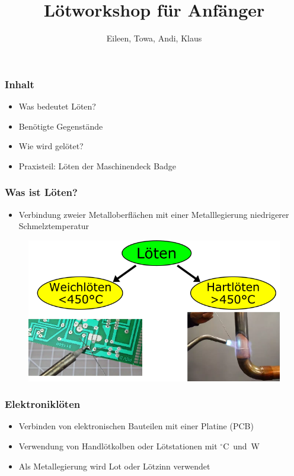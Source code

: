 \documentclass[10pt]{beamer}
\title[soldering-workshop] %
{Lötworkshop für Anfänger}
\author{Eileen, Towa, Andi, Klaus}
\begin{document}
    \maketitle
    
    
    \begin{frame}
    \frametitle{Inhalt}
    \begin{itemize}
    	\item{Was bedeutet Löten?}
    	\item{Benötigte Gegenstände}
    	\item{Wie wird gelötet?}
    	\item{Praxisteil: Löten der Maschinendeck Badge}
    \end{itemize}
	\end{frame}
    
    \begin{frame}
    \frametitle{Was ist Löten?}
    \begin{itemize}
    	\item{Verbindung zweier Metalloberflächen mit einer Metalllegierung niedrigerer Schmelztemperatur}
    \end{itemize}
	\begin{figure}[hbtp]
		\centering
		\includegraphics[width=\linewidth*2/3]{images/weich_hartloeten.png}
	\end{figure}
	\end{frame}

	\begin{frame}
	\frametitle{Elektroniklöten}
	\begin{itemize}
		\item{Verbinden von elektronischen Bauteilen mit einer Platine (PCB)}
		\item{Verwendung von Handlötkolben oder Lötstationen mit \unit[300 - 400]{$^\circ$C} und \unit[30 - 100]{W}}
		\item{Als Metallegierung wird Lot oder Lötzinn verwendet}
	\end{itemize}
	\end{frame}
\end{document}
